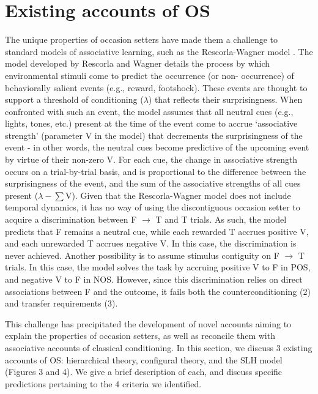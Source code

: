 \documentclass[11pt]{article}
\let\cite=\citep
\begin{document}
\section*{Existing accounts of OS}

The unique properties of occasion setters have made them a challenge to 
standard models of associative learning, such as the Rescorla-Wagner model 
\cite{Rescorla1972}. The model developed by Rescorla and Wagner details the 
process by which environmental stimuli come to predict the occurrence (or non-
occurrence) of behaviorally salient events (e.g., reward, footshock). These 
events are thought to support a threshold of conditioning ($\lambda$) that 
reflects their surprisingness. When confronted with such an event, the model 
assumes that all neutral cues (e.g., lights, tones, etc.) present at the time 
of the event come to accrue `associative strength' (parameter V in the model) 
that decrements the surprisingness of the event - in other words, the neutral 
cues become predictive of the upcoming event by virtue of their non-zero V. For 
each cue, the change in associative strength occurs on a trial-by-trial basis, 
and is proportional to the difference between the surprisingness of the event, 
and the sum of the associative strengths of all cues present ($\lambda - \sum
$V). Given that the Rescorla-Wagner model does not include temporal dynamics, 
it has no way of using the discontiguous occasion setter to acquire a 
discrimination between F $\rightarrow$ T and T trials. As such, the model 
predicts that F remains a neutral cue, while each rewarded T accrues positive 
V, and each unrewarded T accrues negative V. In this case, the discrimination 
is never achieved. Another possibility is to assume stimulus contiguity on F $
\rightarrow$ T trials. In this case, the model solves the task by accruing 
positive V to F in POS, and negative V to F in NOS. However, since this 
discrimination relies on direct associations between F and the outcome, it 
fails both the counterconditioning (2) and transfer requirements (3).
	
This challenge has precipitated the development of novel accounts aiming to 
explain the properties of occasion setters, as well as reconcile them with 
associative accounts of classical conditioning. In this section, we discuss 3 
existing accounts of OS: hierarchical theory, configural theory, and the SLH 
model (Figures 3 and 4). We give a brief description of each, and discuss 
specific predictions pertaining to the 4 criteria we identified. 
\end{document}
